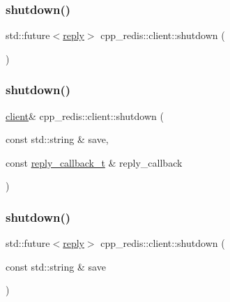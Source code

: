 \mbox{\label{classcpp__redis_1_1client_ae457a1b446eff2e264452eb35de72d37}} 
\subsubsection{\texorpdfstring{shutdown()}{shutdown()}\hspace{0.1cm}{\footnotesize\ttfamily [2/4]}}
{\footnotesize\ttfamily std\+::future$<$\hyperlink{classcpp__redis_1_1reply}{reply}$>$ cpp\+\_\+redis\+::client\+::shutdown (\begin{DoxyParamCaption}{ }\end{DoxyParamCaption})}

\mbox{\label{classcpp__redis_1_1client_aca186e9b705a566203a47e8b29f99a28}} 
\subsubsection{\texorpdfstring{shutdown()}{shutdown()}\hspace{0.1cm}{\footnotesize\ttfamily [3/4]}}
{\footnotesize\ttfamily \hyperlink{classcpp__redis_1_1client}{client}\& cpp\+\_\+redis\+::client\+::shutdown (\begin{DoxyParamCaption}\item[{const std\+::string \&}]{save,  }\item[{const \hyperlink{classcpp__redis_1_1client_a061a1140d36d2eaeda82b09a0bb3f9f2}{reply\+\_\+callback\+\_\+t} \&}]{reply\+\_\+callback }\end{DoxyParamCaption})}

\mbox{\label{classcpp__redis_1_1client_a8587aeb1044e85ae580cd9661ea826dc}} 
\subsubsection{\texorpdfstring{shutdown()}{shutdown()}\hspace{0.1cm}{\footnotesize\ttfamily [4/4]}}
{\footnotesize\ttfamily std\+::future$<$\hyperlink{classcpp__redis_1_1reply}{reply}$>$ cpp\+\_\+redis\+::client\+::shutdown (\begin{DoxyParamCaption}\item[{const std\+::string \&}]{save }\end{DoxyParamCaption})}

